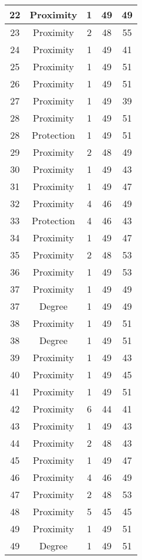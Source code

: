 \documentclass[results.tex]{subfiles}
\begin{document}
\begin{center}
\begin{tabular}{| c || c | c | c | c |}
    \hline
    22 & Proximity & 1 & 49 & 49 \\ 
    \hline
    23 & Proximity & 2 & 48 & 55 \\ 
    \hline
    24 & Proximity & 1 & 49 & 41 \\ 
    \hline
    25 & Proximity & 1 & 49 & 51 \\ 
    \hline
    26 & Proximity & 1 & 49 & 51 \\ 
    \hline
    27 & Proximity & 1 & 49 & 39 \\ 
    \hline
    28 & Proximity & 1 & 49 & 51 \\ 
    \hline
    28 & Protection & 1 & 49 & 51 \\ 
    \hline
    29 & Proximity & 2 & 48 & 49 \\ 
    \hline
    30 & Proximity & 1 & 49 & 43 \\ 
    \hline
    31 & Proximity & 1 & 49 & 47 \\ 
    \hline
    32 & Proximity & 4 & 46 & 49 \\ 
    \hline
    33 & Protection & 4 & 46 & 43 \\ 
    \hline
    34 & Proximity & 1 & 49 & 47 \\ 
    \hline
    35 & Proximity & 2 & 48 & 53 \\ 
    \hline
    36 & Proximity & 1 & 49 & 53 \\ 
    \hline
    37 & Proximity & 1 & 49 & 49 \\ 
    \hline
    37 & Degree & 1 & 49 & 49 \\ 
    \hline
    38 & Proximity & 1 & 49 & 51 \\ 
    \hline
    38 & Degree & 1 & 49 & 51 \\ 
    \hline
    39 & Proximity & 1 & 49 & 43 \\ 
    \hline
    40 & Proximity & 1 & 49 & 45 \\ 
    \hline
    41 & Proximity & 1 & 49 & 51 \\ 
    \hline
    42 & Proximity & 6 & 44 & 41 \\ 
    \hline
    43 & Proximity & 1 & 49 & 43 \\ 
    \hline
    44 & Proximity & 2 & 48 & 43 \\ 
    \hline
    45 & Proximity & 1 & 49 & 47 \\ 
    \hline
    46 & Proximity & 4 & 46 & 49 \\ 
    \hline
    47 & Proximity & 2 & 48 & 53 \\ 
    \hline
    48 & Proximity & 5 & 45 & 45 \\ 
    \hline
    49 & Proximity & 1 & 49 & 51 \\ 
    \hline
    49 & Degree & 1 & 49 & 51 \\ 
    \hline   \end{tabular}
\end{center}
\end{document}
